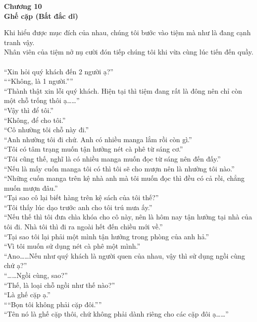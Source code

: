 \documentclass[12pt,a4paper, twosides]{book}
\begin{document}
    \begin{center}
    \textbf{\large Chương 10 \\ Ghế cặp (Bất đắc dĩ)}
    \end{center}
    \noindent
Khi hiểu được mục đích của nhau, chúng tôi bước vào tiệm mà như là đang cạnh tranh vậy.\\
Nhân viên của tiệm nở nụ cười đón tiếp chúng tôi khi vừa cùng lúc tiến đến quầy.\\
\\
“Xin hỏi quý khách đến 2 người ạ?”\\
““Không, là 1 người.””\\
“Thành thật xin lỗi quý khách. Hiện tại thì tiệm đang rất là đông nên chỉ còn một chỗ trống thôi ạ……”\\
“Vậy thì để tôi.”\\
“Không, để cho tôi.”\\
“Cô nhường tôi chỗ này đi.”\\
“Anh nhường tôi đi chứ. Anh có nhiều manga lắm rồi còn gì.”\\
“Tôi có tâm trạng muốn tận hưởng nét cà phê từ sáng cơ.”\\
“Tôi cũng thế, nghĩ là có nhiều manga muốn đọc từ sáng nên đến đấy.”\\
“Nếu là mấy cuốn manga tôi có thì tôi sẽ cho mượn nên là nhường tôi nào.”\\
“Những cuốn manga trên kệ nhà anh mà tôi muốn đọc thì đều có cả rồi, chẳng muốn mượn đâu.”\\
“Tại sao cô lại biết hàng trên kệ sách của tôi thế?”\\
“Tôi thấy lúc dạo trước anh cho tôi trú mưa ấy.”\\
“Nếu thế thì tôi đưa chìa khóa cho cô này, nên là hôm nay tận hưởng tại nhà của tôi đi. Nhà tôi thì đi ra ngoài hết đến chiều mới về.”\\
“Tại sao tôi lại phải một mình tận hưởng trong phòng của anh hả.”\\
“Vì tôi muốn sử dụng nét cà phê một mình.”\\
“Ano……Nếu như quý khách là người quen của nhau, vậy thì sử dụng ngồi cùng chứ ạ?”\\
“……Ngồi cùng, sao?”\\
“Thế, là loại chỗ ngồi như thế nào?”\\
“Là ghế cặp ạ.”\\
““Bọn tôi không phải cặp đôi.””\\
“Tên nó là ghế cặp thôi, chứ không phải dành riêng cho các cặp đôi ạ……”\\
\end{document}
